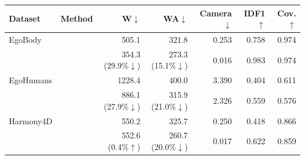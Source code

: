 \begin{tabular}{llrrrrr}
\toprule
Dataset & Method & W$\downarrow$ & WA$\downarrow$ & Camera$\downarrow$ & IDF1$\uparrow$ & Cov.$\uparrow$ \\
\midrule
EgoBody & \humanthree{} & 505.1 & 321.8 & 0.253 & 0.758 & 0.974 \\
 & \method{} & 354.3 (29.9\%$\downarrow$) & 273.3 (15.1\%$\downarrow$) & 0.016 & 0.983 & 0.974 \\
\addlinespace
EgoHumans & \humanthree{} & 1228.4 & 400.0 & 3.390 & 0.404 & 0.611 \\
 & \method{} & 886.1 (27.9\%$\downarrow$) & 315.9 (21.0\%$\downarrow$) & 2.326 & 0.559 & 0.576 \\
\addlinespace
Harmony4D & \humanthree{} & 550.2 & 325.7 & 0.250 & 0.418 & 0.866 \\
 & \method{} & 552.6 (0.4\%$\uparrow$) & 260.7 (20.0\%$\downarrow$) & 0.017 & 0.622 & 0.859 \\
\bottomrule
\end{tabular}
